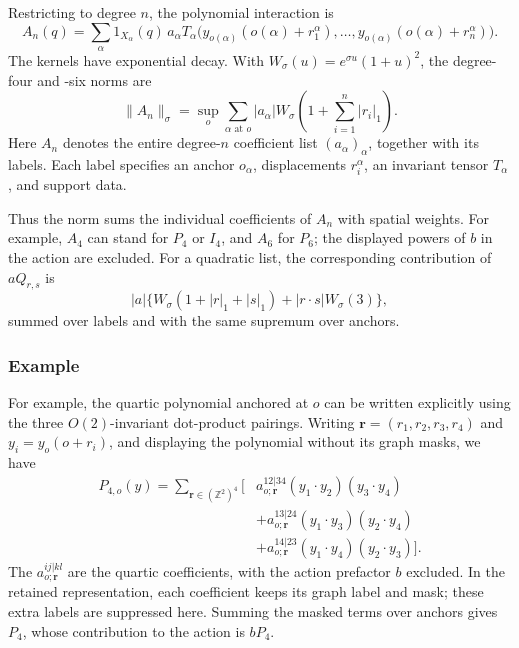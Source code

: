 \documentclass[11pt]{article}
\numberwithin{equation}{section}
\theoremstyle{definition}
\theoremstyle{plain}
\begin{document}
%
Restricting to degree $n$, the polynomial interaction is
\begin{equation}
 A_n(q)=\sum_\alpha 1_{X_\alpha}(q)\,a_\alpha
 T_\alpha\bigl(y_{o(\alpha)}(o(\alpha)+r_1^\alpha),\ldots,
               y_{o(\alpha)}(o(\alpha)+r_n^\alpha)\bigr).
\end{equation}
The kernels have exponential decay.
With $W_\sigma(u)=e^{\sigma u}(1+u)^2$, the degree-four and -six norms are
\begin{equation}
 \|A_n\|_\sigma
 =\sup_o\sum_{\alpha\text{ at }o}
 |a_\alpha|W_\sigma\!\left(1+\sum_{i=1}^n|r_i|_1\right).
 \label{eq:canonical-coefficient-norm}
\end{equation}
Here $A_n$ denotes the entire degree-$n$ coefficient list
$(a_\alpha)_\alpha$, together with its labels.  Each label specifies
an anchor $o_\alpha$, displacements $r_i^\alpha$, an invariant
tensor $T_\alpha$, and support data. 

Thus the norm sums the individual coefficients of $A_n$ with
spatial weights.  For example, $A_4$ can stand for $P_4$ or $I_4$,
and $A_6$ for $P_6$; the displayed powers of $b$ in the action are
excluded.  
For a quadratic list, the corresponding contribution of $aQ_{r,s}$ is
\begin{equation}
 |a|\bigl\{W_\sigma(1+|r|_1+|s|_1)
                 +|r\cdot s|W_\sigma(3)\bigr\},
\end{equation}
summed over labels and with the same supremum over anchors.

\subsubsection{Example}

For example, the quartic polynomial anchored at $o$ can be written
explicitly using the three $O(2)$-invariant dot-product pairings.
Writing $\mathbf r=(r_1,r_2,r_3,r_4)$ and $y_i=y_o(o+r_i)$,
and displaying the polynomial without its graph masks, we have
\begin{equation}
 \begin{split}
 P_{4,o}(y)=\sum_{\mathbf r\in(\mathbb Z^2)^4}\bigl[&
 a^{12|34}_{o;\mathbf r}(y_1\cdot y_2)(y_3\cdot y_4)\\
 &+a^{13|24}_{o;\mathbf r}(y_1\cdot y_3)(y_2\cdot y_4)\\
 &+a^{14|23}_{o;\mathbf r}(y_1\cdot y_4)(y_2\cdot y_3)\bigr].
 \end{split}
 \label{eq:quartic-anchor-polynomial}
\end{equation}
The $a^{ij|kl}_{o;\mathbf r}$ are the quartic coefficients, with
the action prefactor $b$ excluded.  In the retained representation,
each coefficient keeps its graph label and mask; these extra labels
are suppressed here.  Summing the masked terms over anchors gives
$P_4$, whose contribution to the action is $bP_4$.
\end{document}
